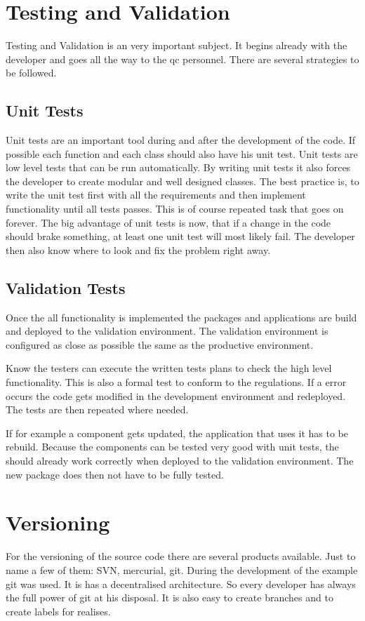 \documentclass[paper=a4,twoside=false,BCOR=0mm,DIV=calc,fontsize=12pt]{scrartcl}
\begin{document}
\section{Testing and Validation}
Testing and Validation is an very important subject. It begins already with the developer and goes all the way to the qc personnel.
There are several strategies to be followed.

\subsection{Unit Tests}
Unit tests are an important tool during and after the development of the code. If possible each function and each class should also have his unit test. 
Unit tests are low level tests that can be run automatically. By writing unit tests it also forces the developer to create modular and well designed classes.
The best practice is, to write the unit test first with all the requirements and then implement functionality until all tests passes. This is of course repeated task 
that goes on forever.
The big advantage of unit tests is now, that if a change in the code should brake something, at least one unit test will most likely fail.
The developer then also know where to look and fix the problem right away.

\subsection{Validation Tests}
Once the all functionality is implemented the packages and applications are build and deployed to the validation environment. The validation environment is configured as 
close as possible the same as the productive environment.

Know the testers can execute the written tests plans to check the high level functionality. This is also a formal test to conform to the regulations. If a error occurs 
the code gets modified in the development environment and redeployed. The tests are then repeated where needed.

If for example a component gets updated, the application that uses it has to be rebuild. Because the components can be tested very good with unit tests, the should already work correctly when deployed to the validation environment.
The new package does then not have to be fully tested.

\section{Versioning}
For the versioning of the source code there are several products available. Just to name a few of them: SVN, mercurial, git.
During the development of the example git was used. It is has a decentralised architecture. So every developer has always the full power of git at his disposal. It is also easy to create branches and to create labels for realises.
\end{document}
